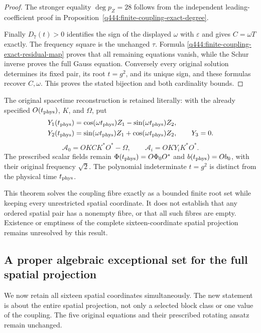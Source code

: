 \begin{proof}
The stronger equality $\deg p_Z=28$ follows from the independent
leading-coefficient proof in Proposition~\ref{q444:finite-coupling-exact-degree}.

Finally $D_7(t)>0$ identifies the sign of the displayed $\omega$ with
$\varepsilon$ and gives $C=\omega T$ exactly. The frequency square is
the unchanged $\tau$. Formula
\eqref{q444:finite-coupling-exact-residual-map} proves that all remaining
equations vanish, while the Schur inverse proves the full Gauss equation.
Conversely every original solution determines its fixed pair, its root
$t=g^2$, and its unique sign, and these formulas recover $C,\omega$.
This proves the stated bijection and both cardinality bounds.
\end{proof}

The original spacetime reconstruction is retained literally: with the
already specified $O(t_{\rm phys})$, $K$, and $\Omega$, put
\[
 \begin{aligned}
 Y_1(t_{\rm phys})&=\cos(\omega t_{\rm phys})Z_1
                         -\sin(\omega t_{\rm phys})Z_2,\\
 Y_2(t_{\rm phys})&=\sin(\omega t_{\rm phys})Z_1
                         +\cos(\omega t_{\rm phys})Z_2,\qquad Y_3=0.
 \end{aligned}
\]
\[
 \mathcal A_0=OKCK^*O^*-\Omega,\qquad
 \mathcal A_i=OKY_iK^*O^*.
\]
The prescribed scalar fields remain
$\Phi(t_{\rm phys})=O\Phi_0O^*$ and $b(t_{\rm phys})=Ob_0$, with their
original frequency $\sqrt2$. The polynomial indeterminate $t=g^2$ is
distinct from the physical time $t_{\rm phys}$.

This theorem solves the coupling fibre exactly as a bounded finite root
set while keeping every unrestricted spatial coordinate. It does not
establish that any ordered spatial pair has a nonempty fibre, or that
all such fibres are empty. Existence or emptiness of the complete
sixteen-coordinate spatial projection remains unresolved by this result.

\subsection{A proper algebraic exceptional set for the full spatial projection}
\label{q444:generic-projection-section}

We now retain all sixteen spatial coordinates simultaneously. The new
statement is about the entire spatial projection, not only a selected
block class or one value of the coupling. The five original equations and
their prescribed rotating ansatz remain unchanged.

